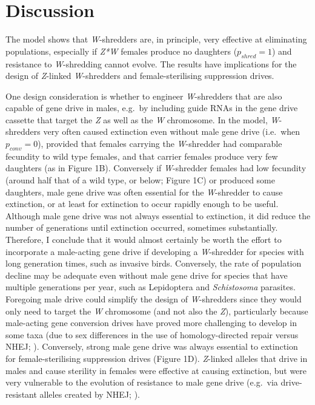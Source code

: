 \documentclass[]{rsos}%
\begin{document}
\hypertarget{discussion}{%
\section{Discussion}\label{discussion}}

The model shows that \emph{W}-shredders are, in principle, very
effective at eliminating populations, especially if \emph{Z*W} females
produce no daughters (\(p_{shred} = 1\)) and resistance to
\emph{W}-shredding cannot evolve. The results have implications for the
design of \emph{Z}-linked \emph{W}-shredders and female-sterilising
suppression drives.

One design consideration is whether to engineer \emph{W}-shredders that
are also capable of gene drive in males, e.g.~by including guide RNAs in
the gene drive cassette that target the \emph{Z} as well as the \emph{W}
chromosome. In the model, \emph{W}-shredders very often caused
extinction even without male gene drive (i.e.~when \(p_{conv} = 0\)),
provided that females carrying the \emph{W}-shredder had comparable
fecundity to wild type females, and that carrier females produce very
few daughters (as in Figure 1B). Conversely if \emph{W}-shredder females
had low fecundity (around half that of a wild type, or below; Figure 1C)
or produced some daughters, male gene drive was often essential for the
\emph{W}-shredder to cause extinction, or at least for extinction to
occur rapidly enough to be useful. Although male gene drive was not
always essential to extinction, it did reduce the number of generations
until extinction occurred, sometimes substantially. Therefore, I
conclude that it would almost certainly be worth the effort to
incorporate a male-acting gene drive if developing a \emph{W}-shredder
for species with long generation times, such as invasive birds.
Conversely, the rate of population decline may be adequate even without
male gene drive for species that have multiple generations per year,
such as Lepidoptera and \emph{Schistosoma} parasites. Foregoing male
drive could simplify the design of \emph{W}-shredders since they would
only need to target the \emph{W} chromosome (and not also the \emph{Z}),
particularly because male-acting gene conversion drives have proved more
challenging to develop in some taxa (due to sex differences in the use
of homology-directed repair versus NHEJ; \citep{grunwald2019super}).
Conversely, strong male gene drive was always essential to extinction
for female-sterilising suppression drives (Figure 1D). \emph{Z}-linked
alleles that drive in males and cause sterility in females were
effective at causing extinction, but were very vulnerable to the
evolution of resistance to male gene drive (e.g.~via drive-resistant
alleles created by NHEJ; \citep{unckless2017ev}).
\end{document}
